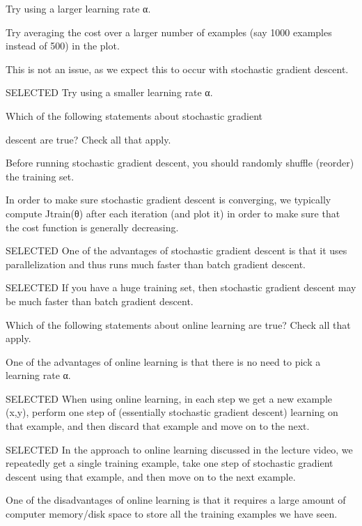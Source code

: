 \documentclass[11pt]{article} %
\begin{document}
Try using a larger learning rate α.

Try averaging the cost over a larger number of examples (say 1000 examples instead of 500) in the plot.

This is not an issue, as we expect this to occur with stochastic gradient descent.

SELECTED Try using a smaller learning rate α.


Which of the following statements about stochastic gradient

descent are true? Check all that apply.

Before running stochastic gradient descent, you should randomly shuffle (reorder) the training set.

In order to make sure stochastic gradient descent is converging, we typically compute Jtrain(θ) after each iteration (and plot it) in order to make sure that the cost function is generally decreasing.

SELECTED One of the advantages of stochastic gradient descent is that it uses parallelization and thus runs much faster than batch gradient descent.

SELECTED If you have a huge training set, then stochastic gradient descent may be much faster than batch gradient descent.


Which of the following statements about online learning are true? Check all that apply.

One of the advantages of online learning is that there is no need to pick a learning rate α.

SELECTED When using online learning, in each step we get a new example (x,y), perform one step of (essentially stochastic gradient descent) learning on that example, and then discard that example and move on to the next.

SELECTED In the approach to online learning discussed in the lecture video, we repeatedly get a single training example, take one step of stochastic gradient descent using that example, and then move on to the next example.

One of the disadvantages of online learning is that it requires a large amount of computer memory/disk space to store all the training examples we have seen.

\end{document}
